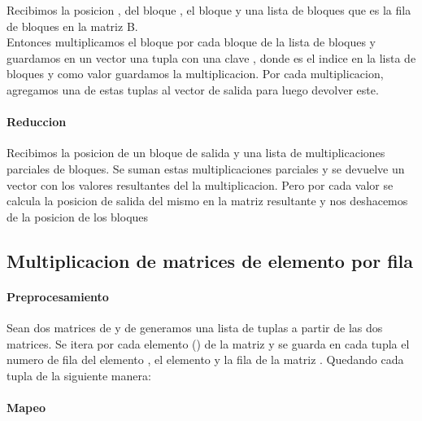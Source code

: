         Recibimos la posicion ,  del bloque , el bloque
         y una lista de bloques  que es la fila  de
        bloques en la matriz B.\\
        Entonces multiplicamos el bloque  por cada bloque de la lista de
        bloques  y guardamos en un vector una tupla con una clave
        ,  donde  es el indice en la lista de
        bloques  y como valor guardamos la multiplicacion. Por cada
        multiplicacion, agregamos una de estas tuplas al vector de salida para
        luego devolver este.

    \paragraph{Reduccion}

        Recibimos la posicion de un bloque de salida y una lista de
        multiplicaciones parciales de bloques. Se suman estas multiplicaciones
        parciales y se devuelve un vector con los valores resultantes del la
        multiplicacion. Pero por cada valor se calcula la posicion de salida del
        mismo en la matriz resultante y nos deshacemos de la posicion de los
        bloques

\subsection{Multiplicacion de matrices de elemento por fila}

    \paragraph{Preprocesamiento}

        Sean dos matrices  de  y  de 
        generamos una lista de tuplas a partir de las dos matrices.
        Se itera por cada elemento () de la matriz  y se
        guarda en cada tupla el numero de fila  del elemento
        , el elemento  y la fila  de la
        matriz . Quedando cada tupla de la siguiente manera:\\

    \paragraph{Mapeo}

